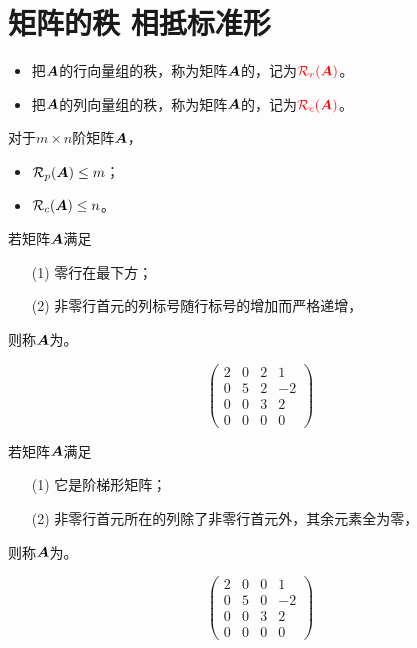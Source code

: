 \section{矩阵的秩 \quad 相抵标准形}
\begin{frame}
\begin{dingyi}[行秩 \& 列秩]
  \begin{itemize}
  \item
    把$\boldsymbol{A}$的行向量组的秩，称为矩阵$\boldsymbol{A}$的，记为$\textcolor{red}{\mathcal{R}_r(\boldsymbol{A})}$。
  \item
    把$\boldsymbol{A}$的列向量组的秩，称为矩阵$\boldsymbol{A}$的，记为$\textcolor{red}{\mathcal{R}_c(\boldsymbol{A})}$。
  \end{itemize}      
\end{dingyi}    
对于$m\times n$阶矩阵$\boldsymbol{A}$，
\begin{itemize}
\item $\mathcal{R}_p(\boldsymbol{A}) \le m$；
\item $\mathcal{R}_c(\boldsymbol{A}) \le n$。
\end{itemize}
\end{frame}

\begin{frame}
\begin{dingyi}[阶梯形矩阵]
  若矩阵$\boldsymbol{A}$满足
  \begin{itemize}
  \item[(1)] 零行在最下方；
  \item[(2)] 非零行首元的列标号随行标号的增加而严格递增，
  \end{itemize}
  则称$\boldsymbol{A}$为。
\end{dingyi}

\begin{li}
  $$
  \left(
    \begin{array}{rrrr}
      2&0&2&1\\
      0&5&2&-2\\
      0&0&3&2\\
      0&0&0&0
    \end{array}
  \right)
  $$
\end{li}
\end{frame}

\begin{frame}
\begin{dingyi}[行简化阶梯形矩阵]
  若矩阵$\boldsymbol{A}$满足
  \begin{itemize}
  \item[(1)] 它是阶梯形矩阵；
  \item[(2)] 非零行首元所在的列除了非零行首元外，其余元素全为零，
  \end{itemize}
  则称$\boldsymbol{A}$为。
\end{dingyi}

\begin{li}
  $$
  \left(
    \begin{array}{rrrr}
      2&0&0&1\\
      0&5&0&-2\\
      0&0&3&2\\
      0&0&0&0
    \end{array}
  \right)
  $$
\end{li}
\end{frame}

